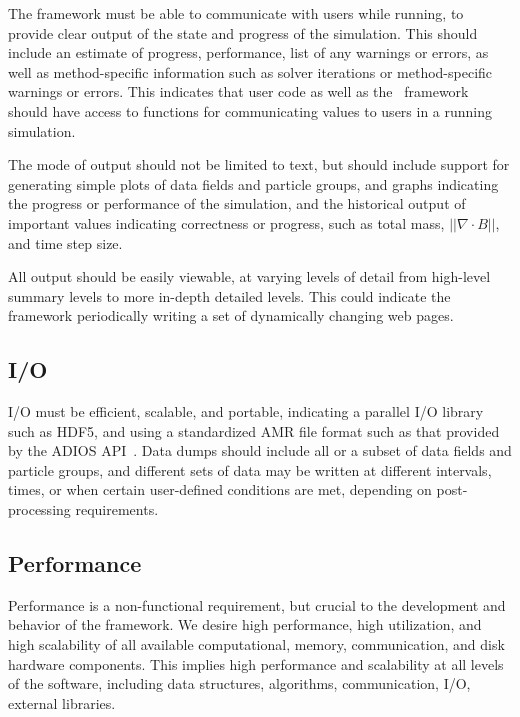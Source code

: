 \documentclass[10pt]{article}
\begin{document}
The framework must be able to communicate with users while running, to
provide clear output of the state and progress of the simulation.
This should include an estimate of progress, performance, list of any
warnings or errors, as well as method-specific information such as
solver iterations or method-specific warnings or errors.  This
indicates that user code as well as the \cello\ framework should have
access to functions for communicating values to users in a running
simulation.

The mode of output should not be limited to text, but should include
support for generating simple plots of data fields and particle
groups, and graphs indicating the progress or performance of the
simulation, and the historical output of important values indicating
correctness or progress, such as total mass, $||\nabla \cdot B||$, and
time step size.

All output should be easily viewable, at varying levels of detail from
high-level summary levels to more in-depth detailed levels.  This
could indicate the framework periodically writing a set of dynamically
changing web pages.


\subsection{I/O } \label{ss:require-io}

I/O must be efficient, scalable, and portable, indicating a parallel
I/O library such as HDF5, and using a standardized AMR file format
such as that provided by the ADIOS API~\cite{LoKl08}.  Data dumps
should include all or a subset of data fields and particle groups, and
different sets of data may be written at different intervals, times,
or when certain user-defined conditions are met, depending on
post-processing requirements.

\subsection{Performance}  \label{ss:require-performance}

Performance is a non-functional requirement, but crucial to the
development and behavior of the framework.  We desire high
performance, high utilization, and high scalability of all available
computational, memory, communication, and disk hardware components.
This implies high performance and scalability at all levels of the
software, including data structures, algorithms, communication, I/O,
external libraries.
\end{document}

